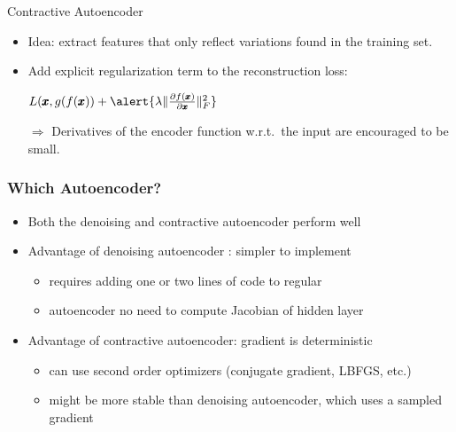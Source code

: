 \documentclass[11pt,mathserif]{beamer}
\begin{document}
\begin{frame}[t]{Contractive Autoencoder}
   \begin{itemize}
       \item Idea: extract features that only reflect variations found in the training set.
       \item Add explicit regularization term 
        to the reconstruction loss:\\
           \begin{center}
       $L(\pmb{x}, g(f(\pmb{x})) + \alert{\lambda \Vert \frac{\partial f(\pmb{x})}{\partial \pmb{x}} \Vert^2_F}$ 
   \end{center}
   
  $\Rightarrow$  Derivatives of the encoder function w.r.t.~the input are encouraged to be small.
   \end{itemize} 
\end{frame}

\begin{frame}
\frametitle{Which Autoencoder?}

\begin{itemize}
\item Both the denoising and contractive autoencoder perform well
\item Advantage of denoising autoencoder : simpler to implement
\begin{itemize}
\item  requires adding one or two lines of code to regular 
\item autoencoder no need to compute Jacobian of hidden layer
\end{itemize}
\item Advantage of contractive autoencoder: gradient is deterministic
\begin{itemize}
\item can use second order optimizers (conjugate gradient, LBFGS, etc.)
\item might be more stable than denoising autoencoder, which uses a sampled gradient
\end{itemize}
\end{itemize}

\end{frame}
\end{document}
